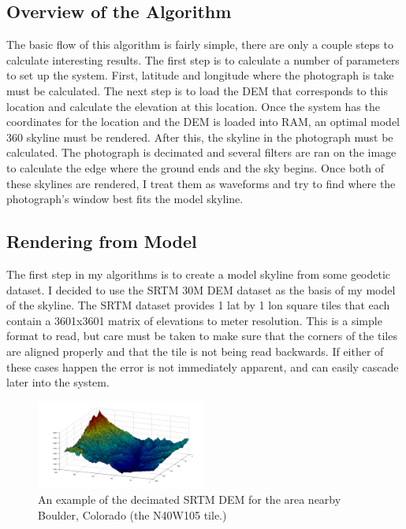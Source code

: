 \documentclass{acm_proc_article-sp}
\begin{document}
\subsection{Overview of the Algorithm}
	The basic flow of this algorithm is fairly simple, there are only a couple steps to calculate interesting results.  The first step is to calculate a number of parameters to set up the system.  First, latitude and longitude where the photograph is take must be calculated.  The next step is to load the DEM that corresponds to this location and calculate the elevation at this location.  Once the system has the coordinates for the location and the DEM is loaded into RAM, an optimal model 360 skyline must be rendered. 
	After this, the skyline in the photograph must be calculated.  The photograph is decimated and several filters are ran on the image to calculate the edge where the ground ends and the sky begins. Once both of these skylines are rendered, I treat them as waveforms \cite{Schafer:DSP} and try to find where the photograph's window best fits the model skyline. 
\subsection{Rendering from Model}
The first step in my algorithms is to create a model skyline from some geodetic dataset.  I decided to use the  SRTM 30M DEM dataset as the basis of my model of the skyline.  The SRTM dataset provides 1 lat by 1 lon square tiles that each contain a 3601x3601 matrix of elevations to meter resolution. \cite{farr2007shuttle} This is a simple format to read, but care must be taken to make sure that the corners of the tiles are aligned properly and that the tile is not being read backwards. If either of these cases happen the error is not immediately apparent, and can easily cascade later into the system.  
\begin{figure}
	\centering
	\includegraphics[width=0.5\textwidth]{boulderDem.png}
	\caption{An example of the decimated SRTM DEM for the area nearby Boulder, Colorado (the N40W105 tile.)}
	\label{fig:bldrDem}
\end{figure}
\end{document}
